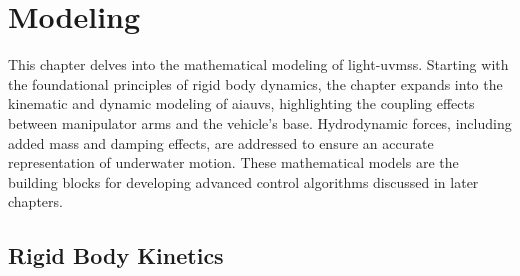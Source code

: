 \chapter{Modeling}
\label{chap:modeling}

This chapter delves into the mathematical modeling of light-\gls{uvms}s. Starting with the foundational 
principles of rigid body dynamics, the chapter expands into the kinematic and 
dynamic modeling of \gls{aiauv}s, highlighting the coupling 
effects between manipulator arms and the vehicle's base. Hydrodynamic forces, 
including added mass and damping effects, are addressed to ensure an accurate 
representation of underwater motion. These mathematical models are the building
blocks for developing advanced control algorithms discussed in later chapters.

\section{Rigid Body Kinetics}


